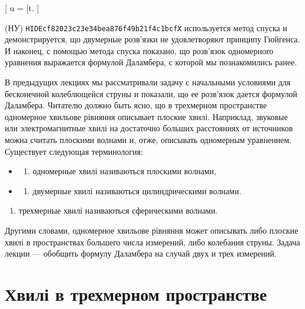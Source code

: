 \documentclass[
  ukrainian,
]{article}
\providecommand{\tightlist}{%
  \setlength{\itemsep}{0pt}\setlength{\parskip}{0pt}}
\begin{document}
{[} u =  {[}t\overline{\varphi}{]}. {]}

(НУ) \texttt{HIDEcf82023c23e34bea876f49b21f4c1bcfX} используется метод
спуска и демонстрируется, що двумерные розв'язки не удовлетворяют
принципу Гюйгенса. И наконец, с помощью метода спуска показано, що
розв'язок одномерного уравнения выражается формулой Даламбера, с которой
мы познакомились ранее.

В предыдущих лекциях мы рассматривали задачу с начальными условиями для
бесконечной колеблющейся струны и показали, що ее розв'язок дается
формулой Даламбера. Читателю должно быть ясно, що в трехмерном
пространстве одномерное хвильове рівняння описывает плоские хвилі.
Наприклад, звуковые или электромагнитные хвилі на достаточно больших
расстояниях от источников можна считать плоскими волнами и, отже,
описывать одномерным уравнением. Существует следующая терминология:

\begin{itemize}
\tightlist
\item
  \begin{enumerate}
  \def\labelenumi{\arabic{enumi})}
  \tightlist
  \item
    одномерные хвилі називаються плоскими волнами,
  \end{enumerate}
\item
  \begin{enumerate}
  \def\labelenumi{\arabic{enumi})}
  \setcounter{enumi}{1}
  \tightlist
  \item
    двумерные хвилі називаються цилиндрическими волнами.
  \end{enumerate}
\end{itemize}

\begin{enumerate}
\def\labelenumi{\arabic{enumi})}
\setcounter{enumi}{2}
\tightlist
\item
  трехмерные хвилі називаються сферическими волнами.
\end{enumerate}

Другими словами, одномерное хвильове рівняння может описывать либо
плоские хвилі в пространствах большего числа измерений, либо колебания
струны. Задача лекции --- обобщить формулу Даламбера на случай двух и
трех измерений.

\section{Хвилі в трехмерном
пространстве}\label{ux445ux432ux438ux43bux456-ux432-ux442ux440ux435ux445ux43cux435ux440ux43dux43eux43c-ux43fux440ux43eux441ux442ux440ux430ux43dux441ux442ux432ux435}
\end{document}

